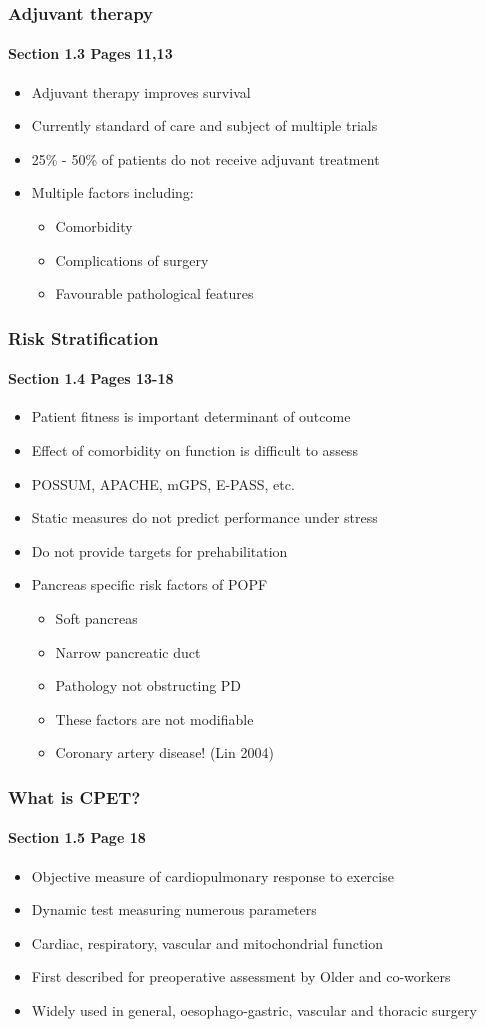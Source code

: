 \documentclass[10pt]{beamer}
\begin{document}
\begin{frame}
	\frametitle{Adjuvant therapy}
	\framesubtitle{Section 1.3 Pages 11,13 }
	\begin{itemize}
		\item Adjuvant therapy improves survival
		\item Currently standard of care and subject of multiple trials
		\item 25\% - 50\% of patients do not receive adjuvant treatment
		\item Multiple factors including:
		\begin{itemize}
			\item Comorbidity
			\item Complications of surgery
			\item Favourable pathological features
		\end{itemize}
	\end{itemize}
\end{frame}

\begin{frame}
	\frametitle{Risk Stratification }
	\framesubtitle{Section 1.4 Pages 13-18 }
	\begin{itemize}
		\item Patient fitness is important determinant of outcome
		\item Effect of comorbidity on function is difficult to assess
		\item POSSUM, APACHE, mGPS, E-PASS, etc.
		\item Static measures do not predict performance under stress
		\item Do not provide targets for prehabilitation
		\item Pancreas specific risk factors of POPF
		\begin{itemize}
			\item Soft pancreas
			\item Narrow pancreatic duct
			\item Pathology not obstructing PD
			\item These factors are not modifiable
			\item Coronary artery disease! (Lin 2004)
		\end{itemize}
	\end{itemize}
\end{frame}

\begin{frame}
	\frametitle{What is CPET?}
	\framesubtitle{Section 1.5 Page 18}
	\begin{itemize}
		\item Objective measure of cardiopulmonary response to exercise
		\item Dynamic test measuring numerous parameters
		\item Cardiac, respiratory, vascular and mitochondrial function
		\item First described for preoperative assessment by Older and co-workers
		\item Widely used in general, oesophago-gastric, vascular and thoracic surgery
	\end{itemize}
\end{frame}
\end{document}

